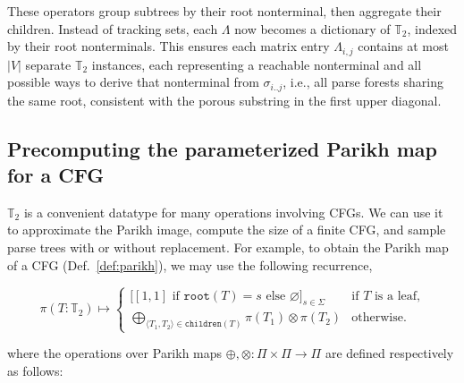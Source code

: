 \documentclass[sigplan,acmsmall,nonacm,screen]{acmart}\settopmatter{printfolios=false,printccs=false,printacmref=false}
\begin{document}
These operators group subtrees by their root nonterminal, then aggregate their children. Instead of tracking sets, each $\Lambda$ now becomes a dictionary of $\mathbb{T}_2$, indexed by their root nonterminals. This ensures each matrix entry $\Lambda_{i,j}$ contains at most $|V|$ separate $\mathbb{T}_2$ instances, each representing a reachable nonterminal and all possible ways to derive that nonterminal from $\sigma_{i..j}$, i.e., all parse forests sharing the same root, consistent with the porous substring in the first upper diagonal.

  \subsection{Precomputing the parameterized Parikh map for a CFG}\label{sec:ppm}

  $\mathbb{T}_2$ is a convenient datatype for many operations involving CFGs. We can use it to approximate the Parikh image, compute the size of a finite CFG, and sample parse trees with or without replacement. For example, to obtain the Parikh map of a CFG (Def.~\ref{def:parikh}), we may use the following recurrence,

\begin{equation}
  \pi(T: \mathbb{T}_2) \mapsto \begin{cases}
  \big[[1, 1] \text{ if } \texttt{root}(T) = s \text{ else } \varnothing\big]_{s\in \Sigma}  & \text{if $T$ is a leaf,} \\
  \bigoplus_{\langle T_1, T_2\rangle \in \texttt{children}(T)} \pi(T_1) \otimes \pi(T_2) & \text{otherwise.}
  \end{cases}
\end{equation}


  \noindent where the operations over Parikh maps $\oplus, \otimes: \Pi \times \Pi \rightarrow \Pi$ are defined respectively as follows:
\end{document}
